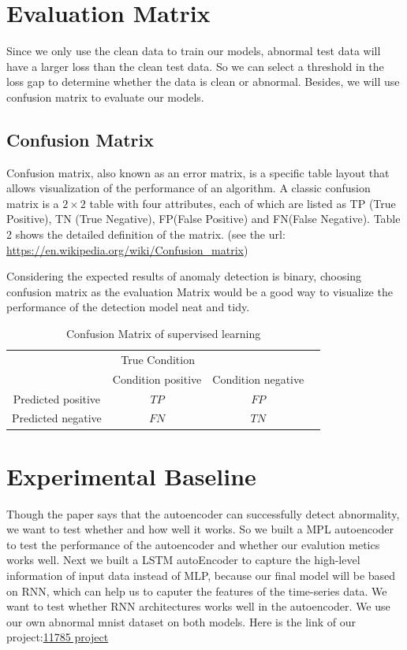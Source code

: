 \documentclass{article}
\begin{document}
\section{Evaluation Matrix}
Since we only use the clean data to train our models, abnormal test data will have a larger loss than the clean test data. So we can select a threshold in the loss gap to determine whether the data is clean or abnormal. Besides, we will use confusion matrix to evaluate our models.

\subsection{Confusion Matrix}
Confusion matrix, also known as an error matrix, is a specific table layout that allows visualization of the performance of an algorithm. A classic confusion matrix is a $2\times 2$ table with four attributes, each of which are listed as TP (True Positive), TN (True Negative), FP(False Positive) and FN(False Negative). Table 2 shows the detailed definition of the matrix. (see the url: \url{https://en.wikipedia.org/wiki/Confusion_matrix})

Considering the expected results of anomaly detection is binary, choosing confusion matrix as the evaluation Matrix would be a good way to visualize the performance of the detection model neat and tidy. 

\begin{table}
  \caption{Confusion Matrix of supervised learning}
  \label{obd data}
  \centering
  \begin{tabular}{cccc}
    \toprule
    \multicolumn{3}{c}{True Condition}                   \\
    \cmidrule(r){1-3}
    & Condition positive & Condition negative      \\
    \midrule
    Predicted positive & $TP$ & $FP$     \\
    Predicted negative & $FN$ & $TN$       \\
    \bottomrule
  \end{tabular}
\end{table}


\section{Experimental Baseline}
Though the paper says that the autoencoder can successfully detect abnormality, we want to test whether and how well it works. So we built a MPL autoencoder to test the performance of the autoencoder and whether our evalution metics works well. Next we built a LSTM autoEncoder to capture the high-level information of input data instead of MLP, because our final model will be based on RNN, which can help us to caputer the features of the time-series data. We want to test whether RNN
architectures works well in the autoencoder. We use our own abnormal mnist dataset on both models. Here is the link of our project:\href{https://github.com/Dylan-Wyl10/11-785-20F-project}{11785 project}
\end{document}

